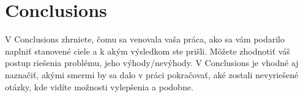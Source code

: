 \chapter{Conclusions}

V Conclusions zhrniete, čomu sa venovala vaša práca, ako sa vám podarilo naplniť stanovené ciele a k akým výsledkom ste prišli. Môžete zhodnotiť váš postup riešenia problému, jeho výhody/nevýhody. V Conclusions je vhodné aj naznačiť, akými smermi by sa dalo v práci pokračovať, aké zostali nevyriešené otázky, kde vidíte možnosti vylepšenia a podobne.
